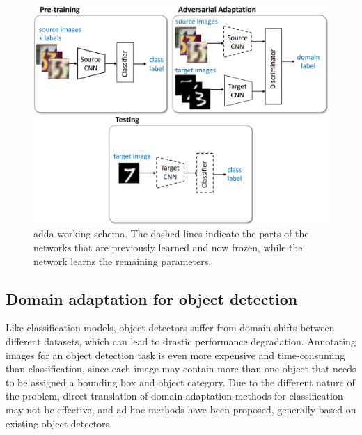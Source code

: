 \documentclass[%
    corpo=12pt,
    twoside,
    stile=classica,   
    tipotesi=magistrale,
    evenboxes,
    english,
	numerazioneromana,
]{toptesi}
\begin{document}
\begin{figure}[ht]
	\centering
	\includegraphics[width=.75\linewidth]{imgs/adda.png}
	\caption[\acrshort{adda} working schema]{\acrshort{adda} working schema\cite{tzeng2017adversarial}. The dashed lines indicate the parts of the networks that are previously learned and now frozen, while the network learns the remaining parameters.}
	\label{fig:adda}
\end{figure}

\subsection{Domain adaptation for object detection}
Like classification models, object detectors suffer from domain shifts between different datasets, which can lead to drastic performance degradation. Annotating images for an object detection task is even more expensive and time-consuming than classification, since each image may contain more than one object that needs to be assigned a bounding box and object category. Due to the different nature of the problem, direct translation of domain adaptation methods for classification may not be effective, and ad-hoc methods have been proposed, generally based on existing object detectors.
\end{document}

